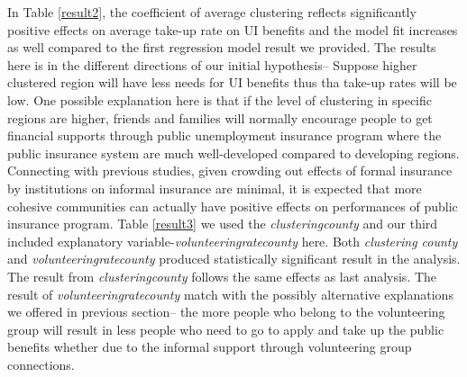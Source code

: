 \documentclass{article}
\begin{document}
In Table \ref{result2}, the coefficient of average clustering reflects significantly positive effects on average take-up rate on UI benefits and the model fit increases as well compared to the first regression model result we provided. The results here is in the different directions of our initial hypothesis-- Suppose higher clustered region will have less needs for UI benefits thus tha take-up rates will be low. One possible explanation here is that if the level of clustering in specific regions are higher, friends and families will normally encourage people to get financial supports through public unemployment insurance program where the public insurance system are much well-developed compared to developing regions. Connecting with previous studies, given crowding out effects of formal insurance by institutions on informal insurance are minimal, it is expected that more cohesive communities can actually have positive effects on performances of public insurance program. Table \ref{result3} we used the \textit{clustering\textunderscore county} and our third included explanatory variable-\textit{volunteering\textunderscore rate\textunderscore county} here. Both \textit{clustering \textunderscore county} and \textit{volunteering\textunderscore rate\textunderscore county} produced statistically significant result in the analysis. The result from \textit{clustering\textunderscore county} follows the same effects as last analysis. The result of \textit{volunteering\textunderscore rate\textunderscore county} match with the possibly alternative explanations we offered in previous section-- the more people who belong to the volunteering group will result in less people who need to go to apply and take up the public benefits whether due to the informal support through volunteering group connections.
\end{document}
